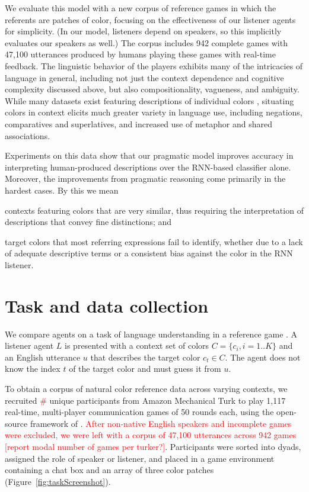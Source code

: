 \documentclass[11pt,letterpaper]{article}
\newcommand{\Listener}{L}
\newcommand{\utt}{u}
\newcommand{\referent}{c}
\newcommand{\context}{C}
\newcommand{\contextlen}{K}
\newcommand{\target}{t}
\renewcommand{\|}{\mid}
\newcommand{\figref}[1]{Figure~\ref{#1}}
\newcommand{\todocheck}[1]{\textcolor{red}{#1}}
\begin{document}
We evaluate this model with a new corpus of reference games in which
the referents are patches of color, focusing on the effectiveness of
our listener agents for simplicity. (In our model, listeners depend on
speakers, so this implicitly evaluates our speakers as well.) The
corpus includes 942 complete games with 47,100 utterances produced by
humans playing these games with real-time feedback. The linguistic
behavior of the players exhibits many of the intricacies of language
in general, including not just the context dependence and cognitive
complexity discussed above, but also compositionality, vagueness, and
ambiguity. While many datasets exist featuring descriptions of
individual colors \cite{Cook2005,Munroe2010,Kawakami2016}, situating
colors in context elicits much greater variety in language use,
including negations, comparatives and superlatives, and increased use
of metaphor and shared associations.

Experiments on this data show that our pragmatic model improves accuracy
in interpreting human-produced descriptions over the RNN-based classifier
alone. Moreover, the improvements from pragmatic reasoning come primarily
in the hardest cases. By this we mean 
%
\begin{enumerate*}[label=(\arabic*)]
\item contexts featuring colors that are very similar, thus requiring
  the interpretation of descriptions that convey fine distinctions;
  and
\item target colors that most referring expressions fail to identify,
  whether due to a lack of adequate descriptive terms or a consistent
  bias against the color in the RNN listener.
\end{enumerate*}


\section{Task and data collection}\label{sec:corpus}

We compare agents on a task of language understanding in a reference
game \cite{Rosenberg:Cohen:1964,Clark:Wilkes-Gibbs:1986,Paetzel-etal:2014}. 
A listener agent $\Listener$ is presented with a context set of colors
$\context = \{\referent_{i}, i=1..\contextlen\}$ and an English
utterance $\utt$ that describes the target color
$\referent_{\target} \in \context$. The agent does not know the index
$\target$ of the target color and must guess it from $\utt$.

To obtain a corpus of natural color reference data across varying
contexts, we recruited \todocheck{\#} unique participants from Amazon
Mechanical Turk to play 1,117 real-time, multi-player communication
games of 50 rounds each, using the open-source framework of
.  \todocheck{After non-native
  English speakers and incomplete games were excluded, we were left
  with a corpus of 47,100 utterances across 942 games [report modal
  number of games per turker?]}. Participants were sorted into dyads,
assigned the role of speaker or listener, and placed in a game
environment containing a chat box and an array of three color patches
(\figref{fig:taskScreenshot}).
\end{document}

